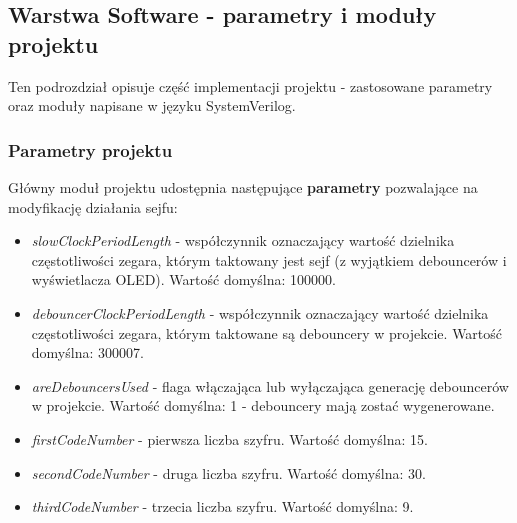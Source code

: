 \documentclass[12pt] {article}
\begin{document}
\subsection{Warstwa Software - parametry i moduły projektu}
Ten podrozdział opisuje część implementacji projektu - zastosowane parametry oraz moduły napisane w języku SystemVerilog.

\subsubsection{Parametry projektu}
Główny moduł projektu udostępnia następujące \textbf{parametry} pozwalające na modyfikację działania sejfu:
\begin{itemize}
\item \textit{slowClockPeriodLength} - współczynnik oznaczający wartość dzielnika częstotliwości zegara, którym taktowany jest sejf (z wyjątkiem debouncerów i wyświetlacza OLED). Wartość domyślna: 100000.
\item \textit{debouncerClockPeriodLength} - współczynnik oznaczający wartość dzielnika częstotliwości zegara, którym taktowane są debouncery w projekcie. Wartość domyślna: 300007.
\item \textit{areDebouncersUsed} - flaga włączająca lub wyłączająca generację debouncerów w projekcie. Wartość domyślna: 1 - debouncery mają zostać wygenerowane.
\item \textit{firstCodeNumber} - pierwsza liczba szyfru. Wartość domyślna: 15.
\item \textit{secondCodeNumber} - druga liczba szyfru. Wartość domyślna: 30.
\item \textit{thirdCodeNumber} - trzecia liczba szyfru. Wartość domyślna: 9.
\end{itemize}
\end{document}

